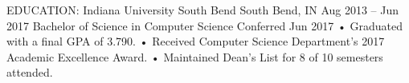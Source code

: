 
EDUCATION:
Indiana University South Bend	South Bend, IN	Aug 2013 – Jun 2017
Bachelor of Science in Computer Science	Conferred Jun 2017
•	Graduated with a final GPA of 3.790.
•	Received Computer Science Department’s 2017 Academic Excellence Award.
•	Maintained Dean’s List for 8 of 10 semesters attended.

